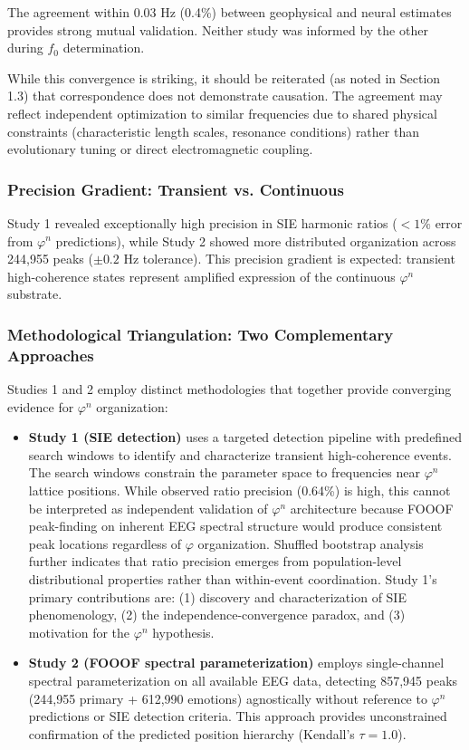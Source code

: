 \documentclass[11pt,a4paper]{article}
\newcommand{\phisym}{\varphi}
\begin{document}
The agreement within 0.03 Hz (0.4\%) between geophysical and neural estimates provides strong mutual validation. Neither study was informed by the other during $f_0$ determination.

While this convergence is striking, it should be reiterated (as noted in Section 1.3) that correspondence does not demonstrate causation. The agreement may reflect independent optimization to similar frequencies due to shared physical constraints (characteristic length scales, resonance conditions) rather than evolutionary tuning or direct electromagnetic coupling.

\subsubsection{Precision Gradient: Transient vs. Continuous}
Study 1 revealed exceptionally high precision in SIE harmonic ratios ($<1\%$ error from $\phisym^n$ predictions), while Study 2 showed more distributed organization across 244,955 peaks ($\pm 0.2$ Hz tolerance). This precision gradient is expected: transient high-coherence states represent amplified expression of the continuous $\phisym^n$ substrate.

\subsubsection{Methodological Triangulation: Two Complementary Approaches}
Studies 1 and 2 employ distinct methodologies that together provide converging evidence for $\phisym^n$ organization:

\begin{itemize}
    \item \textbf{Study 1 (SIE detection)} uses a targeted detection pipeline with predefined search windows to identify and characterize transient high-coherence events. The search windows constrain the parameter space to frequencies near $\phisym^n$ lattice positions. While observed ratio precision (0.64\%) is high, this cannot be interpreted as independent validation of $\phisym^n$ architecture because FOOOF peak-finding on inherent EEG spectral structure would produce consistent peak locations regardless of $\phisym$ organization. Shuffled bootstrap analysis further indicates that ratio precision emerges from population-level distributional properties rather than within-event coordination. Study 1's primary contributions are: (1) discovery and characterization of SIE phenomenology, (2) the independence-convergence paradox, and (3) motivation for the $\phisym^n$ hypothesis.

    \item \textbf{Study 2 (FOOOF spectral parameterization)} employs single-channel spectral parameterization on all available EEG data, detecting 857,945 peaks (244,955 primary + 612,990 emotions) agnostically without reference to $\phisym^n$ predictions or SIE detection criteria. This approach provides unconstrained confirmation of the predicted position hierarchy (Kendall's $\tau = 1.0$).
\end{itemize}
\end{document}
